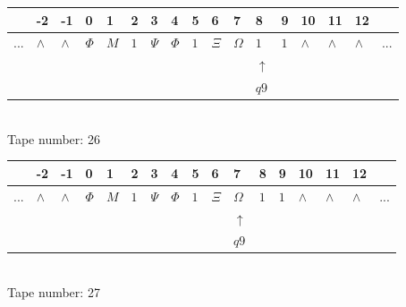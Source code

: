 \documentclass[11pt]{article}
\begin{document}
\begin{table}[H]
\centering
\begin{tabular}{lllllllllllllllll}
 & -2 & -1 & 0 & 1 & 2 & 3 & 4 & 5 & 6 & 7 & 8 & 9 & 10 & 11 & 12 & \\
\hline
$...$ & \multicolumn{1}{|l|}{$\wedge$} & \multicolumn{1}{|l|}{$\wedge$} & \multicolumn{1}{|l|}{$\Phi$} & \multicolumn{1}{|l|}{$M$} & \multicolumn{1}{|l|}{$1$} & \multicolumn{1}{|l|}{$\Psi$} & \multicolumn{1}{|l|}{$\Phi$} & \multicolumn{1}{|l|}{$1$} & \multicolumn{1}{|l|}{$\Xi$} & \multicolumn{1}{|l|}{$\Omega$} & \multicolumn{1}{|l|}{$1$} & \multicolumn{1}{|l|}{$1$} & \multicolumn{1}{|l|}{$\wedge$} & \multicolumn{1}{|l|}{$\wedge$} & \multicolumn{1}{|l|}{$\wedge$} & $...$\\
\hline
&  &  &  &  &  &  &  &  &  &  & $\uparrow$ &  &  &  &  &  \\
&  &  &  &  &  &  &  &  &  &  & $ q9 $ &  &  &  &  &  \\
\end{tabular}
\\
Tape number: 26
\noindent\makebox[\linewidth]{\hdashrule{\textwidth}{1pt}{1pt}}\end{table}

\begin{table}[H]
\centering
\begin{tabular}{lllllllllllllllll}
 & -2 & -1 & 0 & 1 & 2 & 3 & 4 & 5 & 6 & 7 & 8 & 9 & 10 & 11 & 12 & \\
\hline
$...$ & \multicolumn{1}{|l|}{$\wedge$} & \multicolumn{1}{|l|}{$\wedge$} & \multicolumn{1}{|l|}{$\Phi$} & \multicolumn{1}{|l|}{$M$} & \multicolumn{1}{|l|}{$1$} & \multicolumn{1}{|l|}{$\Psi$} & \multicolumn{1}{|l|}{$\Phi$} & \multicolumn{1}{|l|}{$1$} & \multicolumn{1}{|l|}{$\Xi$} & \multicolumn{1}{|l|}{$\Omega$} & \multicolumn{1}{|l|}{$1$} & \multicolumn{1}{|l|}{$1$} & \multicolumn{1}{|l|}{$\wedge$} & \multicolumn{1}{|l|}{$\wedge$} & \multicolumn{1}{|l|}{$\wedge$} & $...$\\
\hline
&  &  &  &  &  &  &  &  &  & $\uparrow$ &  &  &  &  &  &  \\
&  &  &  &  &  &  &  &  &  & $ q9 $ &  &  &  &  &  &  \\
\end{tabular}
\\
Tape number: 27
\noindent\makebox[\linewidth]{\hdashrule{\textwidth}{1pt}{1pt}}\end{table}
\end{document}
